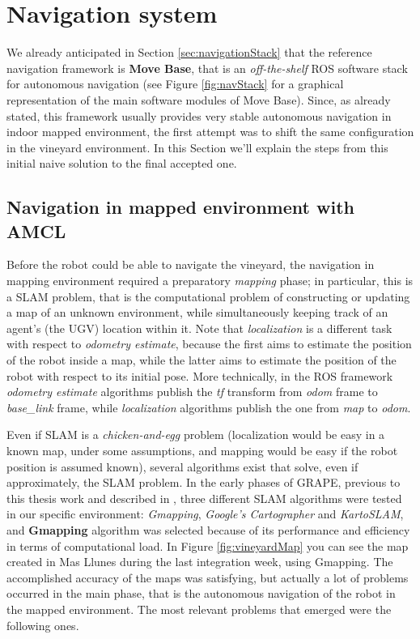 \section{Navigation system}\label{sec:navigationSystem}

We already anticipated in Section \ref{sec:navigationStack} that the reference navigation framework is \textbf{Move Base}, that is an \textit{off-the-shelf} \ac{ROS} software stack for autonomous navigation (see Figure \ref{fig:navStack} for a graphical representation of the main software modules of Move Base). Since, as already stated, this framework usually provides very stable autonomous navigation in indoor mapped environment, the first attempt was to shift the same configuration in the vineyard environment. 
In this Section we'll explain the steps from this initial naive solution to the final accepted one.

\subsection{Navigation in mapped environment with AMCL}

Before the robot could be able to navigate the vineyard, the navigation in mapping environment required a preparatory \textit{mapping} phase; in particular, this is a \ac{SLAM} problem, that is the computational problem of constructing or updating a map of an unknown environment, while simultaneously keeping track of an agent's (the \ac{UGV}) location within it. Note that \textit{localization} is a different task with respect to \textit{odometry estimate}, because the first aims to estimate the position of the robot inside a map, while the latter aims to estimate the position of the robot with respect to its initial pose. More technically, in the \ac{ROS} framework \textit{odometry estimate} algorithms publish the \textit{tf} transform from \textit{odom} frame to \textit{base\_link} frame, while \textit{localization} algorithms publish the one from \textit{map} to \textit{odom}.

\par Even if \ac{SLAM} is a \textit{chicken-and-egg} problem (localization would be easy in a known map, under some assumptions, and mapping would be easy if the robot position is assumed known), several algorithms exist that solve, even if approximately, the \ac{SLAM} problem. In the early phases of \ac{GRAPE}, previous to this thesis work and described in \cite{grapeAltroPaper}, three different \ac{SLAM} algorithms were tested in our specific environment: \textit{Gmapping}, \textit{Google's Cartographer} and \textit{KartoSLAM}, and \textbf{Gmapping} algorithm was selected because of its performance and efficiency in terms of computational load. In Figure \ref{fig:vineyardMap} you can see the map created in Mas Llunes during the last integration week, using Gmapping. The accomplished accuracy of the maps was satisfying, but actually a lot of problems occurred in the main phase, that is the autonomous navigation of the robot in the mapped environment. The most relevant problems that emerged were the following ones. 

